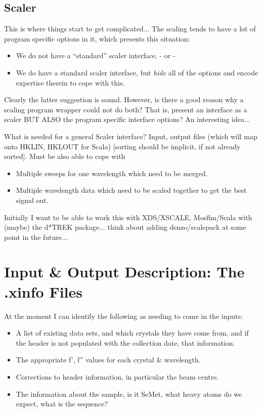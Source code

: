 \documentclass[a4paper, 11pt]{article}
\begin{document}
\subsection{Scaler}

This is where things start to get complicated... The scaling tends to have
a lot of program specific options in it, which presents this situation:

\begin{itemize}
\item{We do not have a ``standard'' scaler interface, - or -}
\item{We do have a standard scaler interface, but \emph{hide} all of the
options and encode expertise therein to cope with this.}
\end{itemize}

\noindent
Clearly the latter suggestion is sound. However, is there a good reason why
a scaling program wrapper could not do both? That is, present an interface
as a scaler BUT ALSO the program specific interface options? An interesting
idea...

What is needed for a general Scaler interface? Input, output files (which 
will map onto HKLIN, HKLOUT for Scala) [sorting should be implicit, if not 
already sorted]. Must be also able to cope with

\begin{itemize}
\item{Multiple sweeps for one wavelength which need to be merged.}
\item{Multiple wavelength data which need to be scaled together to
get the best signal out.}
\end{itemize}

Initially I want to be able to work this with XDS/XSCALE, Mosflm/Scala with
(maybe) the d*TREK package... think about adding denzo/scalepack at some
point in the future...

\section{Input \& Output Description: The .xinfo Files}

At the moment I can identify the following as needing to come in the 
inputs:

\begin{itemize}
\item{A list of existing data sets, and which crystals they have come from,
and if the header is not populated with the collection date, that information.}
\item{The appropriate f', f'' values for each crystal \& wavelength.}
\item{Corrections to header information, in particular the beam centre.}
\item{The information about the sample, is it SeMet, what heavy atoms
do we expect, what is the sequence?}
\end{itemize}
\end{document}
